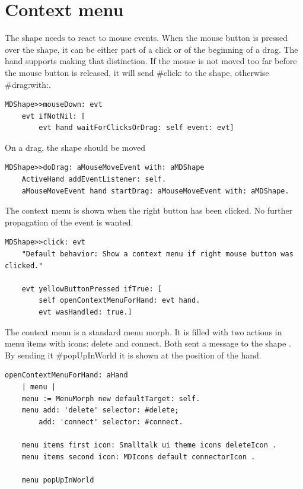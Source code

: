 \documentclass[10pt, twoside]{article}   	%
\begin{document}
\section{Context menu}
The shape needs to react to mouse events. When the mouse button is pressed 
over the shape, it can be either part of a click or of the beginning of a drag.
The hand supports making that distinction. If the mouse is not moved too far
before the mouse button is released, it will send \#click: to the shape, otherwise
\#drag:with:.
\begin{verbatim}
MDShape>>mouseDown: evt
    evt ifNotNil: [  
        evt hand waitForClicksOrDrag: self event: evt]
\end{verbatim}
On a drag, the shape should be moved
\begin{verbatim}
MDShape>>doDrag: aMouseMoveEvent with: aMDShape 
    ActiveHand addEventListener: self.
    aMouseMoveEvent hand startDrag: aMouseMoveEvent with: aMDShape.
\end{verbatim}
The context menu is shown when the right button has been clicked.
No further propagation of the event is wanted.
\begin{verbatim}
MDShape>>click: evt
    "Default behavior: Show a context menu if right mouse button was clicked."
	
    evt yellowButtonPressed ifTrue: [
        self openContextMenuForHand: evt hand.
        evt wasHandled: true.]
\end{verbatim}
The context menu is a standard menu morph. It is filled with two
actions in menu items with icons: delete and connect. Both sent a message to the shape . 
By sending it \#popUpInWorld it is shown at the position of the hand. 
\begin{verbatim}
openContextMenuForHand: aHand
    | menu |
    menu := MenuMorph new defaultTarget: self.
    menu add: 'delete' selector: #delete;
        add: 'connect' selector: #connect.

    menu items first icon: Smalltalk ui theme icons deleteIcon .
    menu items second icon: MDIcons default connectorIcon .

    menu popUpInWorld
\end{verbatim}
\end{document}
